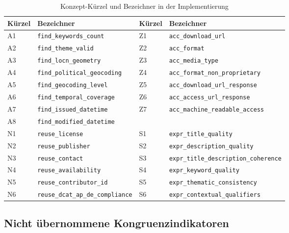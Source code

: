 \begin{table}[H]
\centering
\scriptsize
\renewcommand{\arraystretch}{1.3}
\begin{tabular}{p{} p{} p{} p{}}
\hline
\textbf{Kürzel} & \textbf{Bezeichner} & \textbf{Kürzel} & \textbf{Bezeichner} \\
\hline
A1 & \texttt{find\_keywords\_count} & Z1 & \texttt{acc\_download\_url} \\
A2 & \texttt{find\_theme\_valid} & Z2 & \texttt{acc\_format} \\
A3 & \texttt{find\_locn\_geometry} & Z3 & \texttt{acc\_media\_type} \\
A4 & \texttt{find\_political\_geocoding} & Z4 & \texttt{acc\_format\_non\_proprietary} \\
A5 & \texttt{find\_geocoding\_level} & Z5 & \texttt{acc\_download\_url\_response} \\
A6 & \texttt{find\_temporal\_coverage} & Z6 & \texttt{acc\_access\_url\_response} \\
A7 & \texttt{find\_issued\_datetime} & Z7 & \texttt{acc\_machine\_readable\_access} \\
A8 & \texttt{find\_modified\_datetime} & & \\
\hline
N1 & \texttt{reuse\_license} & S1 & \texttt{expr\_title\_quality} \\
N2 & \texttt{reuse\_publisher} & S2 & \texttt{expr\_description\_quality} \\
N3 & \texttt{reuse\_contact} & S3 & \texttt{expr\_title\_description\_coherence} \\
N4 & \texttt{reuse\_availability} & S4 & \texttt{expr\_keyword\_quality} \\
N5 & \texttt{reuse\_contributor\_id} & S5 & \texttt{expr\_thematic\_consistency} \\
N6 & \texttt{reuse\_dcat\_ap\_de\_compliance} & S6 & \texttt{expr\_contextual\_qualifiers} \\
\hline
\end{tabular}
\caption{Konzept-Kürzel und Bezeichner in der Implementierung}
\label{tab:impl_mapping}
\end{table}

\subsection{Nicht übernommene Kongruenzindikatoren}
\label{subsec:kongruenzindikatoren}

